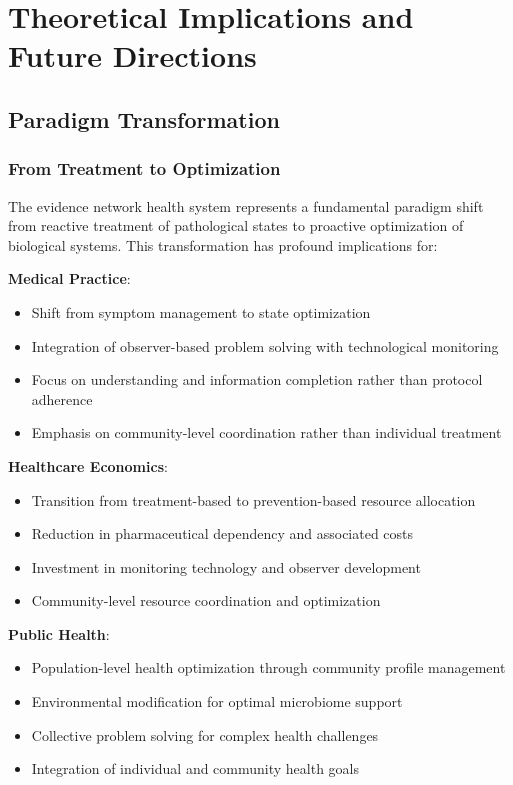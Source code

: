 \documentclass[12pt,a4paper]{article}
\begin{document}
\section{Theoretical Implications and Future Directions}

\subsection{Paradigm Transformation}

\subsubsection{From Treatment to Optimization}

The evidence network health system represents a fundamental paradigm shift from reactive treatment of pathological states to proactive optimization of biological systems. This transformation has profound implications for:

\textbf{Medical Practice}:
\begin{itemize}
\item Shift from symptom management to state optimization
\item Integration of observer-based problem solving with technological monitoring
\item Focus on understanding and information completion rather than protocol adherence
\item Emphasis on community-level coordination rather than individual treatment
\end{itemize}

\textbf{Healthcare Economics}:
\begin{itemize}
\item Transition from treatment-based to prevention-based resource allocation
\item Reduction in pharmaceutical dependency and associated costs
\item Investment in monitoring technology and observer development
\item Community-level resource coordination and optimization
\end{itemize}

\textbf{Public Health}:
\begin{itemize}
\item Population-level health optimization through community profile management
\item Environmental modification for optimal microbiome support
\item Collective problem solving for complex health challenges
\item Integration of individual and community health goals
\end{itemize}
\end{document}
